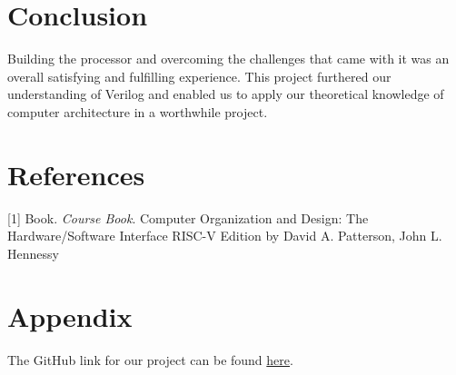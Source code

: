 \documentclass[12pt]{article}
\begin{document}
    

\section{Conclusion}
    Building the processor and overcoming the challenges that came with it was an overall satisfying and fulfilling experience. This project furthered our understanding of Verilog and enabled us to apply our theoretical knowledge of computer architecture in a worthwhile project.

\section{References}

[1] Book. \textit{Course Book}. Computer Organization and Design: The Hardware/Software Interface RISC-V Edition by David A. Patterson, John L. Hennessy

\section{Appendix}
The GitHub link for our project can be found \href{https://github.com/RaahimHash/Pipelined-RISC-V-Processor}{here}.

    
\end{document}
